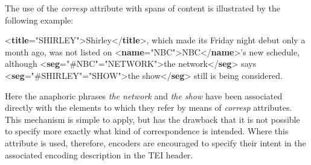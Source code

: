 The use of the {\itshape corresp} attribute with spans of content is illustrated by the following example: \par\bgroup{}\exampleFont \begin{shaded}\noindent\mbox{}{<\textbf{title}\hspace*{1em}{xml:id}="{SHIRLEY}">}Shirley{</\textbf{title}>}, which made\mbox{}\newline 
 its Friday night debut only a month ago, was\mbox{}\newline 
 not listed on {<\textbf{name}\hspace*{1em}{xml:id}="{NBC}">}NBC{</\textbf{name}>}'s new schedule,\mbox{}\newline 
 although {<\textbf{seg}\hspace*{1em}{corresp}="{\#NBC}"\hspace*{1em}{xml:id}="{NETWORK}">}the network{</\textbf{seg}>}\mbox{}\newline 
 says {<\textbf{seg}\hspace*{1em}{corresp}="{\#SHIRLEY}"\hspace*{1em}{xml:id}="{SHOW}">}the show{</\textbf{seg}>}\mbox{}\newline 
 still is being considered.\end{shaded}\egroup\par \noindent     Here the anaphoric phrases \textit{the network} and \textit{the show} have been associated directly with the elements to which they refer by means of {\itshape corresp} attributes. This mechanism is simple to apply, but has the drawback that it is not possible to specify more exactly what kind of correspondence is intended. Where this attribute is used, therefore, encoders are encouraged to specify their intent in the associated encoding description in the TEI header.\par
